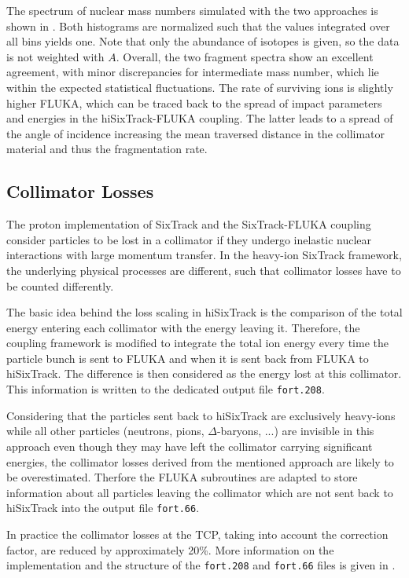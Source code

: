 The spectrum of nuclear mass numbers simulated with the two approaches is shown in . Both histograms are normalized such that the values integrated over all bins yields one. Note that only the abundance of isotopes is given, so the data is not weighted with $A$. Overall, the two fragment spectra show an excellent agreement, with minor discrepancies for intermediate mass number, which lie within the expected statistical fluctuations. The rate of surviving \lead ions is slightly higher FLUKA, which can be traced back to the spread of impact parameters and energies in the hiSixTrack-FLUKA coupling. The latter leads to a spread of the angle of incidence increasing the mean traversed distance in the collimator material and thus the fragmentation rate.




\subsection{Collimator Losses}

The proton implementation of SixTrack and the SixTrack-FLUKA coupling consider particles to be lost in a collimator if they undergo inelastic nuclear interactions with large momentum transfer. In the heavy-ion SixTrack framework, the underlying physical processes are different, such that collimator losses have to be counted differently. 

The basic idea behind the loss scaling in hiSixTrack is the comparison of the total energy entering each collimator with the energy leaving it. Therefore, the coupling framework is modified to integrate the total ion energy every time the particle bunch is sent to FLUKA and when it is sent back from FLUKA to hiSixTrack. The difference is then considered as the energy lost at this collimator. This information is written to the  dedicated output file \texttt{fort.208}.

Considering that the particles sent back to hiSixTrack are exclusively heavy-ions while all other particles (neutrons, pions, $\Delta$-baryons, ...) are invisible in this approach even though they may have left the collimator carrying significant energies, the collimator losses derived from the mentioned approach are likely to be overestimated. Therfore the FLUKA subroutines are adapted to store information about all particles leaving the collimator which are not sent back to hiSixTrack into the output file \texttt{fort.66}.

In practice the collimator losses at the TCP, taking into account the correction factor, are reduced by approximately 20\%. More information on the implementation and the structure of the \texttt{fort.208} and \texttt{fort.66} files is given in \chapref{}.





